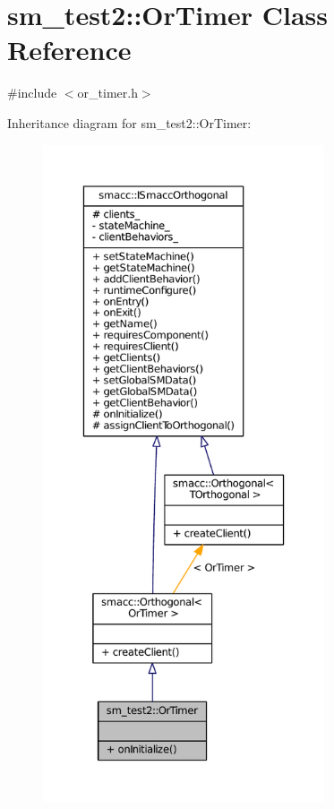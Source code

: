 \hypertarget{classsm__test2_1_1OrTimer}{}\section{sm\+\_\+test2\+:\+:Or\+Timer Class Reference}
\label{classsm__test2_1_1OrTimer}


{\ttfamily \#include $<$or\+\_\+timer.\+h$>$}



Inheritance diagram for sm\+\_\+test2\+:\+:Or\+Timer\+:
\nopagebreak
\begin{figure}[H]
\begin{center}
\leavevmode
\includegraphics[height=550pt]{classsm__test2_1_1OrTimer__inherit__graph}
\end{center}
\end{figure}


